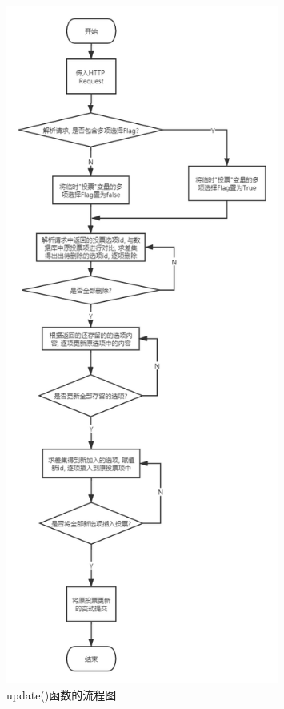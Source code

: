 \begin{figure}[hbp]
    \centering
    \includegraphics[width=0.80\textwidth]{support-files/4.5.1-pollcontroller-update-flowchart.png}
    \caption{update()函数的流程图}
    \label{fig:updateflowchart}
\end{figure}

